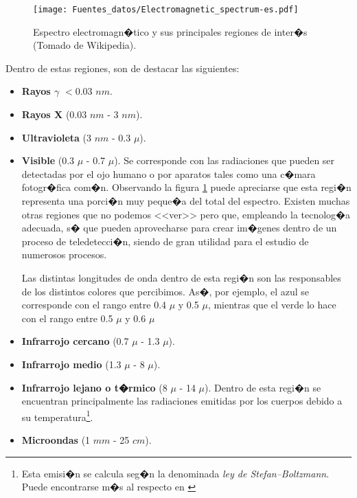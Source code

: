 \begin{figure}[!hbt]   
\centering
\texttt{[image: Fuentes\_datos/Electromagnetic\_spectrum-es.pdf]}
\caption{\small Espectro electromagn�tico y sus principales regiones de inter�s (Tomado de Wikipedia).}
\label{Fig:Espectro_electromagnetico} 
\end{figure}

Dentro de estas regiones, son de destacar las siguientes:

\begin{itemize}
	\item \textbf{Rayos $\gamma$}  $<$0.03 $nm$.
	\item \textbf{Rayos X} (0.03 $nm$ - 3 $nm$).
	\item \textbf{Ultravioleta} (3 $nm$ - 0.3 $\mu$).
	\item \textbf{Visible} (0.3 $\mu$ - 0.7 $\mu$). Se corresponde con las radiaciones que pueden ser detectadas por el ojo humano o por aparatos tales como una c�mara fotogr�fica com�n. Observando la figura \ref{Fig:Espectro_electromagnetico} puede apreciarse que esta regi�n representa una porci�n muy peque�a del total del espectro. Existen muchas otras regiones que no podemos <<ver>> pero que, empleando la tecnolog�a adecuada, s� que pueden aprovecharse para crear im�genes dentro de un proceso de teledetecci�n, siendo de gran utilidad para el estudio de numerosos procesos.


	Las distintas longitudes de onda dentro de esta regi�n son las responsables de los distintos colores que percibimos. As�, por ejemplo, el azul se corresponde con el rango entre 0.4 $\mu$ y 0.5 $\mu$, mientras que el verde lo hace con el rango entre 0.5 $\mu$ y 0.6 $\mu$
	\item \textbf{Infrarrojo cercano} (0.7 $\mu$ - 1.3 $\mu$).
	\item \textbf{Infrarrojo medio}  (1.3 $\mu$ - 8 $\mu$).
	\item \textbf{Infrarrojo lejano o t�rmico} (8 $\mu$ - 14 $\mu$). Dentro de esta regi�n se encuentran principalmente las radiaciones emitidas por los cuerpos debido a su temperatura\footnote{Esta emisi�n se calcula seg�n la denominada \emph{ley de Stefan--Boltzmann}. Puede encontrarse m�s al respecto en \cite{webSBoltzman}}.
	\item \textbf{Microondas} (1 $mm$ - 25 $cm$).
\end{itemize}

